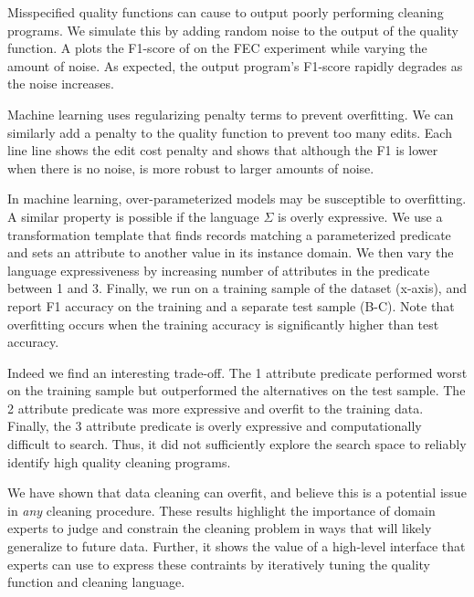   Misspecified quality functions can cause \sys to output poorly performing cleaning programs.  We simulate this by adding random noise to the output of the quality function. A plots the F1-score of \sys on the FEC experiment while varying the amount of noise.  As expected, the output program's F1-score rapidly degrades as the noise increases.  

Machine learning uses regularizing penalty terms to prevent overfitting.  We can similarly add a penalty to the quality function to prevent too many edits.  Each line line shows the edit cost penalty and shows that although the F1 is lower when there is no noise, \sys is more robust to larger amounts of noise. 

 In machine learning, over-parameterized models may be susceptible to overfitting.  A similar property is possible if the language $\Sigma$ is overly expressive.  We use a transformation template that finds records matching a parameterized predicate and sets an attribute to another value in its instance domain.   We then vary the language expressiveness by increasing number of attributes in the predicate between 1 and 3.  Finally, we run \sys on a training sample of the dataset (x-axis), and report F1 accuracy on the training and a separate test sample (B-C).  Note that overfitting occurs when the training accuracy is significantly higher than test accuracy.

Indeed we find an interesting trade-off.  The 1 attribute predicate performed worst on the training sample but outperformed the alternatives on the test sample.  The 2 attribute predicate was more expressive and overfit to the training data.  Finally, the 3 attribute predicate is overly expressive and computationally difficult to search.  Thus, it did not sufficiently explore the search space to reliably identify high quality cleaning programs. 

 We have shown that data cleaning can overfit, and believe this is a potential issue in {\it any} cleaning procedure. These results highlight the importance of domain experts to judge and constrain the cleaning problem in ways that will likely generalize to future data. Further, it shows the value of a high-level interface that experts can use to express these contraints by iteratively tuning the quality function and cleaning language. 

